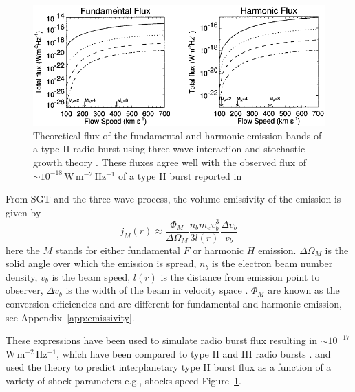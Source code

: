 \begin{figure}[t!]
\begin{center}
\includegraphics[scale=1.1, trim=0cm 0cm 0cm 0.5cm]{images/Cairns2003.pdf}
\caption[Theoretically predicted radio burst fluxes]{Theoretical flux of the fundamental and harmonic emission bands of a type II radio burst using three wave interaction and stochastic growth theory \citet{cairns2003}. {\color{blue}These fluxes agree well with the observed flux of $\sim10^{-18}$\,W\,m$^{-2}$\,Hz$^{-1}$ of a type II burst reported in \citet{bale1999}}}
\label{fig:cairns_emissivity}
\end{center}
\end{figure}
From SGT and the three-wave process, the volume emissivity of the emission is given by
\begin{equation}
j_M(r) \approx \frac{\Phi_M}{\Delta\Omega_M}\frac{n_b m_e v_b^3}{3l(r)}\frac{\Delta v_b}{v_b}
\label{eqn:plasma_emiss}
\end{equation}
here the $M$ stands for either fundamental $F$ or harmonic $H$ emission. $\Delta\Omega_M$ is the solid angle over which the  emission is spread, $n_b$ is the electron beam number density, $v_b$ is the beam speed, $l(r)$ is the distance from emission point to observer, $\Delta v_b$ is the width of the beam in velocity space \citep{robinson1993a, robinson1998}. $\Phi_M$ are known as the conversion efficiencies and are different for fundamental and harmonic emission, see Appendix~\ref{app:emissivity}.

These expressions have been used to simulate radio burst flux resulting in $\sim10^{-17}$\,W\,m$^{-2}$\,Hz$^{-1}$, which have been compared to type II and III radio bursts \citep{schmidt2012, knock2001}. \citet{knock2003} and \citet{cairns2003} used the theory to predict interplanetary type II burst flux as a function of a variety of shock parameters e.g., shocks speed Figure~\ref{fig:cairns_emissivity}.

